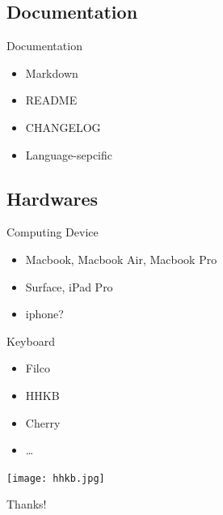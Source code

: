 \documentclass[UTF8]{beamer}
\begin{document}
\subsection{Documentation}

\begin{frame}[t]{Documentation}
    \begin{itemize}
        \item Markdown
        \item README
        \item CHANGELOG
        \item Language-sepcific
    \end{itemize}
\end{frame}

\subsection{Hardwares}

\begin{frame}[t]{Computing Device}
    \begin{itemize}
        \item Macbook, Macbook Air, Macbook Pro
        \item Surface, iPad Pro
        \item iphone?
    \end{itemize}
\end{frame}

\begin{frame}[t]{Keyboard}
    \begin{itemize}
        \item Filco
        \item HHKB
        \item Cherry
        \item \ldots
    \end{itemize}
    \centerline{\texttt{[image: hhkb.jpg]}}
\end{frame}

\begin{frame}
  \centerline{\Huge{Thanks!}}
\end{frame}
\end{document}
